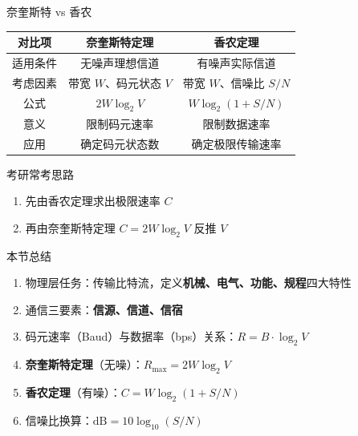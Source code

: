 \documentclass[10pt, aspectratio=169]{beamer}
\begin{document}
\begin{frame}{奈奎斯特 vs 香农}
    \begin{table}
        \begin{tabular}{|c|c|c|}
            \hline
            \textbf{对比项} & \textbf{奈奎斯特定理} & \textbf{香农定理} \\ \hline
            适用条件 & 无噪声理想信道 & 有噪声实际信道 \\
            考虑因素 & 带宽 $W$、码元状态 $V$ & 带宽 $W$、信噪比 $S/N$ \\
            公式 & $2W\log_2 V$ & $W\log_2(1+S/N)$ \\
            意义 & 限制码元速率 & 限制数据速率 \\
            应用 & 确定码元状态数 & 确定极限传输速率 \\
            \hline
        \end{tabular}
    \end{table}
    \vspace{0.5em}
    \begin{block}{考研常考思路}
        \begin{enumerate}
            \item 先由香农定理求出极限速率 $C$
            \item 再由奈奎斯特定理 $C = 2W\log_2 V$ 反推 $V$
        \end{enumerate}
    \end{block}
\end{frame}

\begin{frame}{本节总结}
    \begin{enumerate}
        \item 物理层任务：传输比特流，定义\textbf{机械、电气、功能、规程}四大特性
        \item 通信三要素：\textbf{信源、信道、信宿}
        \item 码元速率（Baud）与数据率（bps）关系：$R = B \cdot \log_2 V$
        \item \textbf{奈奎斯特定理}（无噪）：$R_{\max} = 2W\log_2 V$
        \item \textbf{香农定理}（有噪）：$C = W\log_2(1+S/N)$
        \item 信噪比换算：$\text{dB} = 10\log_{10}(S/N)$
    \end{enumerate}
\end{frame}
\end{document}
